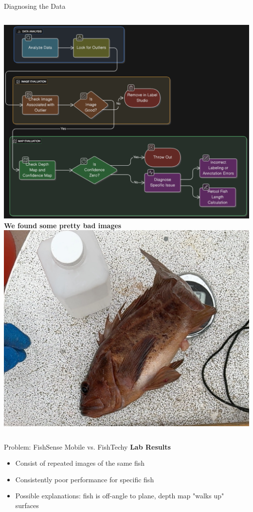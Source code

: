 \begin{frame}{Diagnosing the Data}
    \begin{columns}[c]
        \includegraphics[width=\linewidth]{images/data_flowchart.png}
        \textbf{We found some pretty bad images}
        \includegraphics[width=\linewidth]{images/outlier.png}
    \end{columns}
\end{frame}


\begin{frame}{Problem: FishSense Mobile vs. FishTechy}
    \textbf{Lab Results}
    \begin{itemize}
        \item Consist of repeated images of the same fish
        \item Consistently poor performance for specific fish
        \item Possible explanations: fish is off-angle to plane, depth map "walks up" surfaces
    \end{itemize}
\end{frame}

